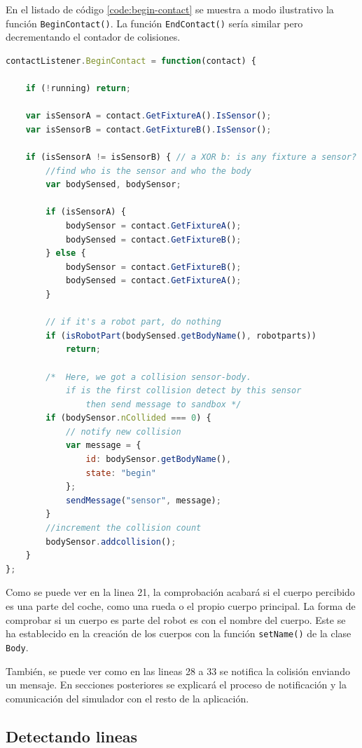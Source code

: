En el listado de código \ref{code:begin-contact} se muestra a modo ilustrativo la función \texttt{BeginContact()}. La función \texttt{EndContact()} sería similar pero decrementando el contador de colisiones.


\begin{lstlisting}[language={Javascript},label={code:begin-contact}, caption={Función \texttt{BeginContact()} definida para los sensores.}]
contactListener.BeginContact = function(contact) {

	if (!running) return;

	var isSensorA = contact.GetFixtureA().IsSensor();
	var isSensorB = contact.GetFixtureB().IsSensor();

	if (isSensorA != isSensorB) { // a XOR b: is any fixture a sensor?
		//find who is the sensor and who the body
		var bodySensed, bodySensor;

		if (isSensorA) {
			bodySensor = contact.GetFixtureA();
			bodySensed = contact.GetFixtureB();
		} else {
			bodySensor = contact.GetFixtureB();
			bodySensed = contact.GetFixtureA();
		}

		// if it's a robot part, do nothing
		if (isRobotPart(bodySensed.getBodyName(), robotparts))
			return;

		/*  Here, we got a collision sensor-body.
			if is the first collision detect by this sensor
				then send message to sandbox */
		if (bodySensor.nCollided === 0) {
			// notify new collision
			var message = {
				id: bodySensor.getBodyName(),
				state: "begin"
			};
			sendMessage("sensor", message);
		}
		//increment the collision count
		bodySensor.addcollision();
	}
};
\end{lstlisting}

Como se puede ver en la linea 21, la comprobación acabará si el cuerpo percibido es una parte del coche, como una rueda o el propio cuerpo principal. La forma de comprobar si un cuerpo es parte del robot es con el nombre del cuerpo. Este se ha establecido en la creación de los cuerpos con la función \texttt{setName()} de la clase \texttt{Body}.

También, se puede ver como en las lineas 28 a 33 se notifica la colisión enviando un mensaje. En secciones posteriores se explicará el proceso de notificación y la comunicación del simulador con el resto de la aplicación.

\subsection{Detectando lineas}
\label{detectando-lineas}


